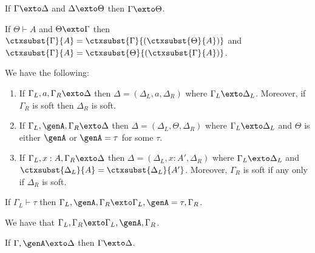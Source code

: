 \begin{mlemma}[Transitivity]
  If $\Gamma \exto \Delta$ and $\Delta \exto \Theta$ then $\Gamma \exto \Theta$.
  \label{lemma:transitivity}
\end{mlemma}


\begin{mlemma}
  If $\Theta \vdash A$ and $\Theta \exto \Gamma$ then $\ctxsubst{\Gamma}{A} =
  \ctxsubst{\Gamma}{(\ctxsubst{\Theta}{A})}$ and $\ctxsubst{\Gamma}{A} = \ctxsubst{\Theta}{(\ctxsubst{\Gamma}{A})}$.
 \label{lemma:subst_ext_invar}
\end{mlemma}


\begin{mlemma} \label{lemma:extension_order}%
  We have the following:
  \begin{enumerate}
  \item If $\Gamma_L, a , \Gamma_R \exto \Delta$ then $\Delta = (\Delta_L, a, \Delta_R)$ where
    $\Gamma_L \exto \Delta_L$. Moreover, if $\Gamma_R$ is soft then $\Delta_R$ is soft.
  \item If $\Gamma_L, \genA, \Gamma_R \exto \Delta$ then $\Delta = (\Delta_L, \Theta, \Delta_R)$ where $\Gamma_L \exto \Delta_L$ and $\Theta$ is either $\genA$ or $\genA = \tau$ for some $\tau$.
  \item If $\Gamma_L , x : A, \Gamma_R \exto \Delta$ then $\Delta = (\Delta_L, x :
    A', \Delta_R)$ where $\Gamma_L \exto \Delta_L$ and $\ctxsubst{\Delta_L}{A} =
    \ctxsubst{\Delta_L}{A'}$. Moreover, $\Gamma_R$ is soft if any only if
    $\Delta_R$ is soft.
  \end{enumerate}
\end{mlemma}

\begin{mlemma}
  If $\Gamma_L \vdash \tau$ then $\Gamma_L, \genA, \Gamma_R \exto \Gamma_L,
  \genA = \tau, \Gamma_R$.
\label{lemma:solution_ext}
\end{mlemma}

\begin{mlemma}
  We have that $\Gamma_L, \Gamma_R \exto \Gamma_L, \genA, \Gamma_R$.
  \label{lemma:unsolved_ext}
\end{mlemma}

\begin{mlemma}
  If $\Gamma, \genA \exto \Delta$ then $\Gamma \exto \Delta$.
  \label{lemma:drop_ext}
\end{mlemma}


